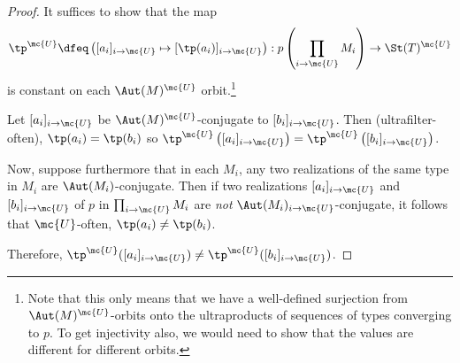 \begin{proof}
  It suffices to show that the map
  $$
\tp^{\mc{U}} \dfeq \left( [a_i]_{i \to \mc{U}} \mapsto [\tp(a_i)]_{i \to \mc{U}} \right) : p \left( \prod_{i \to \mc{U}} M_i \right) \to \St(T)^{\mc{U}}
$$
is constant on each $\Aut(M)^{\mc{U}}$ orbit.\footnote{Note that this only means that we have a well-defined surjection from $\Aut(M)^{\mc{U}}$-orbits onto the ultraproducts of sequences of types converging to $p$. To get injectivity also, we would need to show that the values are different for different orbits.}

Let $[a_i]_{i \to \mc{U}}$ be $\Aut(M)^{\mc{U}}$-conjugate to $[b_i]_{i \to \mc{U}}$. Then (ultrafilter-often), $\tp(a_i) = \tp(b_i)$ so $\tp^{\mc{U}}\left([a_i]_{i \to \mc{U}}\right) = \tp^{\mc{U}}\left([b_i]_{i \to \mc{U}}\right)$.

Now, suppose furthermore that in each $M_i$, any two realizations of the same type in $M_i$ are $\Aut(M_i)$-conjugate. Then if two realizations $[a_i]_{i \to \mc{U}}$ and $[b_i]_{i \to \mc{U}}$ of $p$ in $\prod_{i \to \mc{U}} M_i$ are \emph{not} $\Aut(M_i)_{i \to \mc{U}}$-conjugate, it follows that $\mc{U}$-often, $\tp(a_i) \neq \tp(b_i)$.

Therefore, $\tp^{\mc{U}}([a_i]_{i \to \mc{U}}) \neq \tp^{\mc{U}}([b_i]_{i \to \mc{U}})$.
\end{proof}

